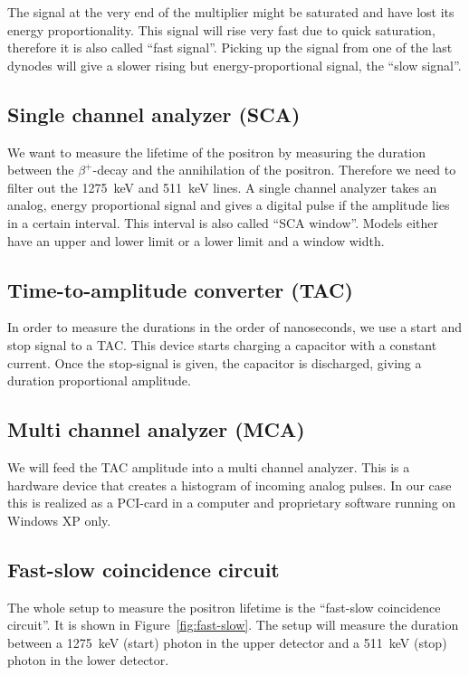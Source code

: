\documentclass[11pt, english, fleqn, DIV=15, headinclude, BCOR=2cm]{scrreprt}
\begin{document}
The signal at the very end of the multiplier might be saturated and have lost
its energy proportionality. This signal will rise very fast due to quick
saturation, therefore it is also called \enquote{fast signal}. Picking up the
signal from one of the last dynodes will give a slower rising but
energy-proportional signal, the \enquote{slow signal}.

\subsection{Single channel analyzer (SCA)}

We want to measure the lifetime of the positron by measuring the duration
between the $\beta^+$-decay and the annihilation of the positron. Therefore we
need to filter out the \SI{1275}{\kilo\electronvolt} and
\SI{511}{\kilo\electronvolt} lines. A single channel analyzer takes an analog,
energy proportional signal and gives a digital pulse if the amplitude lies in a
certain interval. This interval is also called \enquote{SCA window}. Models
either have an upper and lower limit or a lower limit and a window width.

\subsection{Time-to-amplitude converter (TAC)}

In order to measure the durations in the order of nanoseconds, we use a start
and stop signal to a TAC\@. This device starts charging a capacitor with a
constant current. Once the stop-signal is given, the capacitor is discharged,
giving a duration proportional amplitude.

\subsection{Multi channel analyzer (MCA)}

We will feed the TAC amplitude into a multi channel analyzer. This is a
hardware device that creates a histogram of incoming analog pulses. In our case
this is realized as a PCI-card in a computer and proprietary software running
on Windows XP only.

\subsection{Fast-slow coincidence circuit}

The whole setup to measure the positron lifetime is the \enquote{fast-slow
coincidence circuit}. It is shown in Figure~\ref{fig:fast-slow}. The setup will
measure the duration between a \SI{1275}{\kilo\electronvolt} (start) photon in
the upper detector and a \SI{511}{\kilo\electronvolt} (stop) photon in the
lower detector.
\end{document}
